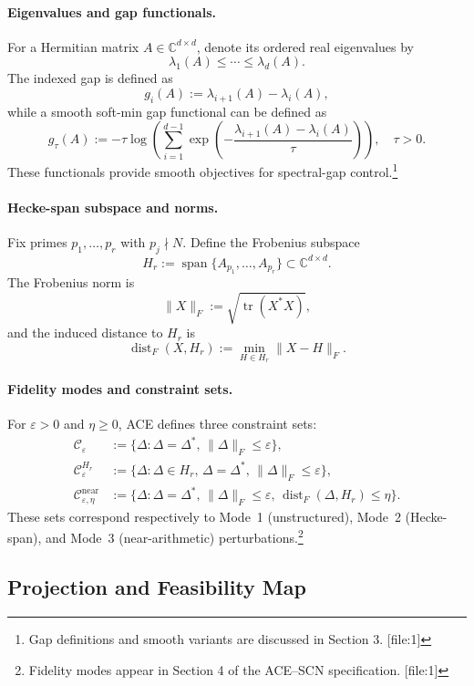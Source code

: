 \documentclass[11pt]{article}
\begin{document}
\paragraph{Eigenvalues and gap functionals.} For a Hermitian matrix \(A\in\mathbb{C}^{d\times d}\), denote its ordered real eigenvalues by
\[
\lambda_1(A) \le \cdots \le \lambda_d(A).
\]
The indexed gap is defined as
\[
g_i(A) := \lambda_{i+1}(A) - \lambda_i(A),
\]
while a smooth soft-min gap functional can be defined as
\[
g_\tau(A) := -\tau \log\!\left(\sum_{i=1}^{d-1} \exp\!\left(-\frac{\lambda_{i+1}(A) - \lambda_i(A)}{\tau}\right)\right), \quad \tau > 0.
\]
These functionals provide smooth objectives for spectral-gap control.\footnote{Gap definitions and smooth variants are discussed in Section 3. [file:1]}

\paragraph{Hecke-span subspace and norms.} Fix primes \(p_1,\dots,p_r\) with \(p_j\nmid N\). Define the Frobenius subspace
\[
H_r := \operatorname{span}\{A_{p_1},\dots,A_{p_r}\} \subset \mathbb{C}^{d\times d}.
\]
The Frobenius norm is
\[
\|X\|_F := \sqrt{\operatorname{tr}(X^*X)},
\]
and the induced distance to \(H_r\) is
\[
\operatorname{dist}_F(X,H_r) := \min_{H\in H_r}\|X - H\|_F.
\]

\paragraph{Fidelity modes and constraint sets.} For \(\varepsilon>0\) and \(\eta\ge 0\), ACE defines three constraint sets:
\begin{align*}
\mathcal{C}_\varepsilon
  &:= \{\Delta : \Delta = \Delta^*,\, \|\Delta\|_F \le \varepsilon\}, \\
\mathcal{C}_\varepsilon^{H_r}
  &:= \{\Delta : \Delta\in H_r,\, \Delta = \Delta^*,\, \|\Delta\|_F \le \varepsilon\}, \\
\mathcal{C}^{\mathrm{near}}_{\varepsilon,\eta}
  &:= \{\Delta : \Delta = \Delta^*,\, \|\Delta\|_F \le \varepsilon,\, \operatorname{dist}_F(\Delta,H_r)\le \eta\}.
\end{align*}
These sets correspond respectively to Mode~1 (unstructured), Mode~2 (Hecke-span), and Mode~3 (near-arithmetic) perturbations.\footnote{Fidelity modes appear in Section 4 of the ACE--SCN specification. [file:1]}

\subsection{Projection and Feasibility Map}
\end{document}
